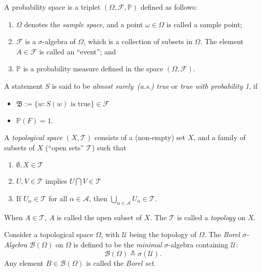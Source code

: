 \begin{definition}
A probability space is a triplet $(\Omega,\mathcal{F},\mathbb{P})$ defined as follows:
\begin{enumerate}
\item
$\Omega$ denotes the \emph{sample space}, 
and a point $\omega\in\Omega$ is called a sample point;
\item
$\mathcal{F}$ is a $\sigma$-algebra of $\Omega$, 
which is a collection of subsets in $\Omega$.
The element $A\in\mathcal{F}$ is called an ``event''; and
\item
$\mathbb{P}$ is a probability measure defined in the space $(\Omega,\mathcal{F})$.
\end{enumerate}
\end{definition}

\begin{definition}
A statement $S$ is said to be \emph{almost surely~(a.s.) true} or \emph{true with probability 1}, if
\begin{itemize}
\item
$\mathfrak{B}:=\{w: S(w)\mbox{ is true}\}\in\mathcal{F}$
\item
$\mathbb{P}(F)=1$.
\end{itemize}
\end{definition}
\begin{definition}
A \emph{topological space} $(X,\mathcal{T})$ consists of a (non-empty) set $X$, and a family of subsets of $X$ (``open sets'' $\mathcal{T}$) such that
\begin{enumerate}
\item
$\emptyset,X\in\mathcal{T}$
\item
$U,V\in\mathcal{T}$ implies $U\bigcap V\in \mathcal{T}$
\item
If $U_\alpha\in\mathcal{T}$ for all $\alpha\in\mathcal{A}$, then $\bigcup_{\alpha\in\mathcal{A}}U_\alpha\in\mathcal{T}$.
\end{enumerate}
When $A\in\mathcal{T}$, $A$ is called the open subset of $X$. The $\mathcal{T}$ is called a \emph{topology} on $X$.
\end{definition}





\begin{definition}
Consider a topological space $\Omega$, with $\mathcal{U}$ being the topology of $\Omega$.
The \emph{Borel $\sigma$-Algebra} $\mathcal{B}(\Omega)$ on $\Omega$ is defined to be 
the \textit{minimal} $\sigma$-algebra containing $\mathcal{U}$:
\[
\mathcal{B}(\Omega)\triangleq \sigma(\mathcal{U}).
\]
Any element $B\in\mathcal{B}(\Omega)$ is called the \emph{Borel set}.
\end{definition}

